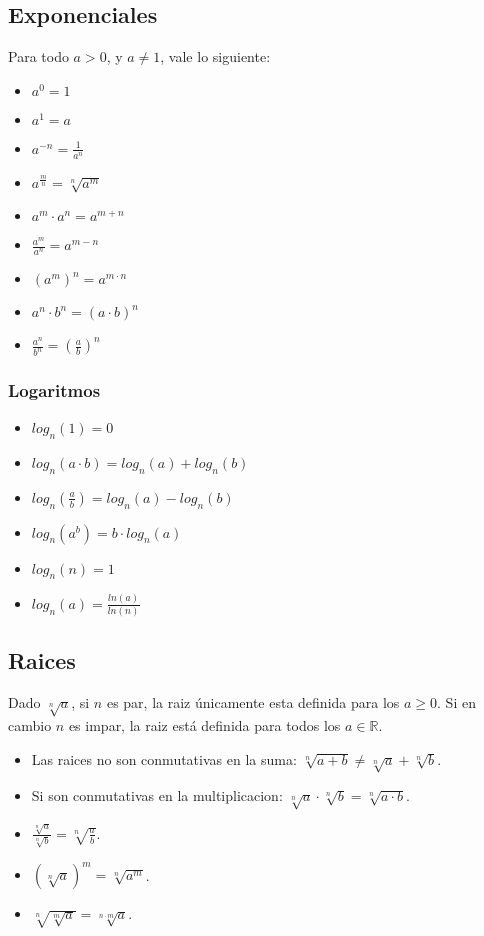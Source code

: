 \documentclass[%
 aip,
 jmp,%
 amsmath,amssymb,
 reprint,%
]{revtex4-1}
\begin{document}
\subsection{Exponenciales}
Para todo $a>0$, y $a \neq 1$, vale lo siguiente:
\begin{itemize}
\item $a^0=1$
\item $a ^ 1 =a$
\item $a^{-n} = \frac{1}{a^n}$
\item $a^{\frac{m}{n}}=\sqrt[n]{a^m}$
\item $a^m \cdot a^n = a^{m+n}$
\item $\frac{a^m}{a^n} = a^{m-n}$
\item $(a^m)^n = a^{m \cdot n}$
\item $a^n \cdot b^n = (a \cdot b)^n$
\item $\frac{a^n}{b^n} = (\frac{a}{b})^n$
\end{itemize}

\subsubsection{Logaritmos}
\begin{itemize}
\item $log_n(1)=0$
\item $log_n(a \cdot b)=log_n(a)+log_n(b)$
\item $log_n(\frac{a}{b})=log_n(a)-log_n(b)$
\item $log_n(a^b)=b \cdot log_n(a)$
\item $log_n(n)=1$
\item $log_n(a)=\frac{ln(a)}{ln(n)}$
\end{itemize}

\subsection{Raices}
Dado $\sqrt[n]{a}$, si $n$ es par, la raiz únicamente esta definida para los $a\geq 0$. Si en cambio $n$ es impar, la raiz está definida para todos los $a \in \mathbb{R}$.
\begin{itemize}
\item Las raices no son conmutativas en la suma: $\sqrt[n]{a+b} \neq \sqrt[n]{a} + \sqrt[n]{b}$.
\item Si son conmutativas en la multiplicacion: $\sqrt[n]{a}\cdot\sqrt[n]{b} = \sqrt[n]{a \cdot b}$.
\item $\frac{\sqrt[n]{a}}{\sqrt[n]{b}} = \sqrt[n]{\frac{a}{b}}$.
\item $(\sqrt[n]{a})^m=\sqrt[n]{a^m}$.
\item $\sqrt[n]{\sqrt[m]{a}}=\sqrt[n \cdot m]{a}$.
\end{itemize}
\end{document}
